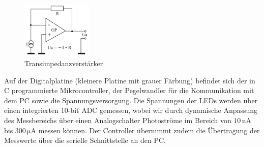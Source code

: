 \documentclass[11pt]{scrartcl}
\newcommand{\unit}[1]{\ensuremath{\,\mathrm{#1}}} %
\begin{document}
\begin{figure}[H]
\begin{center}
\includegraphics[width=0.3\textwidth]{transimpedanz.png}
\end{center}
\vspace{-1.5\baselineskip}
\caption{Transimpedanzverstärker}
\label{fig:transimp}
\end{figure}

Auf der Digitalplatine (kleinere Platine mit grauer Färbung) befindet sich der in C programmierte Mikrocontroller, der Pegelwandler für die Kommunikation mit dem PC sowie die Spannungsversorgung. Die Spannungen der LEDs werden über einen integrierten 10-bit ADC gemessen, wobei wir durch dynamische Anpassung des Messbereichs über einen Analogschalter Photoströme im Bereich von $10 \unit{nA}$ bis $300 \unit{\mu A}$ messen können. Der Controller übernimmt zudem die Übertragung der Messwerte über die serielle Schnittstelle an den PC.
\end{document}
